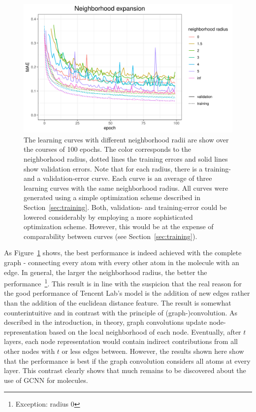 \begin{figure}[H]
	\includegraphics[width=\linewidth]{figures/tencent-mpnn-neighborhood-expansion}
	
	\caption{The learning curves with different neighborhood radii are show over the courses of 100 epochs. The color corresponds to the neighborhood radius, dotted lines the training errors and solid lines show validation errors. Note that for each radius, there is a training- and a validation-error curve. Each curve is an average of three learning curves with the same neighborhood radius. All curves were generated using a simple optimization scheme described in Section~\ref{sec:training}. Both, validation- and training-error could be lowered considerably by employing a more sophisticated optimization scheme. However, this would be at the expense of comparability between curves (see Section~\ref{sec:training}).}
	\label{fig:tencent-mpnn-neighborhood-expansion}
\end{figure}

As Figure~\ref{fig:tencent-mpnn-neighborhood-expansion} shows, the best performance is indeed achieved with the complete graph - connecting every atom with every other atom in the molecule with an edge. In general, the larger the neighborhood radius, the better the performance~\footnote{Exception: radius 0}. This result is in line with the suspicion that the real reason for the good performance of Tencent Lab's model is the addition of new edges rather than the addition of the euclidean distance feature.
The result is somewhat counterintuitive and in contrast with the principle of (graph-)convolution. As described in the introduction, in theory, graph convolutions update node-representation based on the local neighborhood of each node. Eventually, after $t$ layers, each node representation would contain indirect contributions from all other nodes with $t$ or less edges between. However, the results shown here show that the performance is best if the graph convolution considers all atoms at every layer. This contrast clearly shows that much remains to be discovered about the use of GCNN for molecules.

